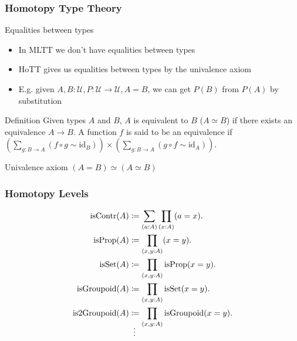 \documentclass{beamer}
\begin{document}
\begin{frame}
\frametitle{Homotopy Type Theory}

Equalities between types

\begin{itemize}

  \item In MLTT we don't have equalities between types
  \item HoTT gives us equalities between types by the univalence axiom 
  \item E.g. given $A, B : \mathcal{U}, P : \mathcal{U} \rightarrow \mathcal{U}, A = B$,
        we can get $P(B)$ from $P(A)$ by substitution

\end{itemize}

\begin{block}{Definition}
  Given types $A$ and $B$, $A$ is equivalent to $B$ ($A \simeq B$) if there exists an
  equivalence $A \rightarrow B$.
  A function $f$ is said to be an equivalence if
  $\left( \sum_{g :B \rightarrow A} (f \circ g \sim \mathrm{id}_B) \right) \times \left( \sum_{g:B \rightarrow A} (g \circ f \sim \mathrm{id}_A) \right)$.
\end{block}

\begin{block}{Univalence axiom}
  $(A = B) \simeq (A \simeq B)$
\end{block}


\end{frame}

\begin{frame}
\frametitle{Homotopy Levels}

\begin{align*}
  \text{isContr}(A) & \coloneqq \sum_{(a:A)} \prod_{(x:A)} (a = x).
  \\
  \text{isProp}(A) & \coloneqq \prod_{(x,y:A)} (x = y).
  \\
  \text{isSet}(A) & \coloneqq \prod_{(x,y:A)} \text{isProp}(x = y).
  \\
  \text{isGroupoid}(A) & \coloneqq \prod_{(x,y:A)} \text{isSet}(x = y).
  \\
  \text{is2Groupoid}(A) & \coloneqq \prod_{(x,y:A)} \text{isGroupoid}(x = y).
  \\
  \shortvdotswithin{=}
\end{align*}

\end{frame}
\end{document}
